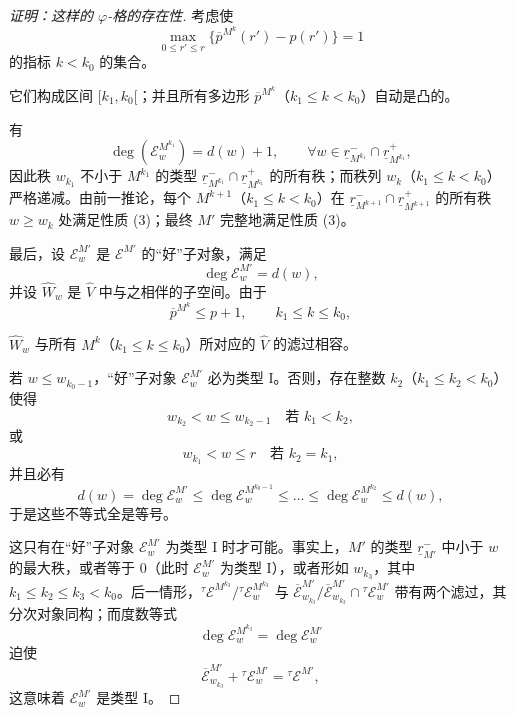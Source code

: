 \begin{proof}[证明：这样的 $\varphi$-格的存在性]
考虑使
\[
\max_{0 \le r' \le r}\{\overline{p}^{M^k}(r') - p(r')\} = 1
\]
的指标 $k < k_0$ 的集合。

它们构成区间 $[k_1, k_0[$；并且所有多边形 $\overline{p}^{M^k}$（$k_1 \le k < k_0$）自动是凸的。

有
\[
\deg(\mathcal{E}^{M^{k_1}}_w) = d(w) + 1, \qquad \forall w \in \underline{r}^-_{M^{k_1}} \cap \underline{r}^+_{M^{k_1}},
\]
因此秩 $w_{k_1}$ 不小于 $M^{k_1}$ 的类型 $\underline{r}^-_{M^{k_1}} \cap \underline{r}^+_{M^{k_1}}$ 的所有秩；而秩列 $w_k$（$k_1 \le k < k_0$）严格递减。由前一推论，每个 $M^{k+1}$（$k_1 \le k < k_0$）在 $\underline{r}^-_{M^{k+1}} \cap \underline{r}^+_{M^{k+1}}$ 的所有秩 $w \ge w_k$ 处满足性质 (3)；最终 $M'$ 完整地满足性质 (3)。

最后，设 $\mathcal{E}^{M'}_w$ 是 $\mathcal{E}^{M'}$ 的“好”子对象，满足
\[
\deg \mathcal{E}^{M'}_w = d(w),
\]
并设 $\widehat{W}_w$ 是 $\widehat{V}$ 中与之相伴的子空间。由于
\[
\overline{p}^{M^k} \le p + 1, \qquad k_1 \le k \le k_0,
\]

$\widehat{W}_w$ 与所有 $M^k$（$k_1 \le k \le k_0$）所对应的 $\widehat{V}$ 的滤过相容。

若 $w \le w_{k_0-1}$，“好”子对象 $\mathcal{E}^{M'}_w$ 必为类型 I。否则，存在整数 $k_2$（$k_1 \le k_2 < k_0$）使得
\[
w_{k_2} < w \le w_{k_2-1} \quad \text{若 } k_1 < k_2,
\]
或
\[
w_{k_1} < w \le r \quad \text{若 } k_2 = k_1,
\]
并且必有
\[
d(w) = \deg \mathcal{E}^{M'}_w \le \deg \mathcal{E}^{M^{k_0-1}}_w \le \dots \le \deg \mathcal{E}^{M^{k_2}}_w \le d(w),
\]
于是这些不等式全是等号。

这只有在“好”子对象 $\mathcal{E}^{M'}_w$ 为类型 I 时才可能。事实上，$M'$ 的类型 $\underline{r}^-_{M'}$ 中小于 $w$ 的最大秩，或者等于 $0$（此时 $\mathcal{E}^{M'}_w$ 为类型 I），或者形如 $w_{k_3}$，其中 $k_1 \le k_2 \le k_3 < k_0$。后一情形，${}^\tau\mathcal{E}^{M^{k_3}}/{}^\tau\mathcal{E}^{M^{k_3}}_w$ 与 $\overline{\mathcal{E}}^{M'}_{w_{k_3}}/\overline{\mathcal{E}}^{M'}_{w_{k_3}} \cap {}^\tau\mathcal{E}^{M'}_w$ 带有两个滤过，其分次对象同构；而度数等式
\[
\deg \mathcal{E}^{M^{k_3}}_w = \deg \mathcal{E}^{M'}_w
\]
迫使
\[
\overline{\mathcal{E}}^{M'}_{w_{k_3}} + {}^\tau\mathcal{E}^{M'}_w = {}^\tau\mathcal{E}^{M'},
\]
这意味着 $\mathcal{E}^{M'}_w$ 是类型 I。
\end{proof}

